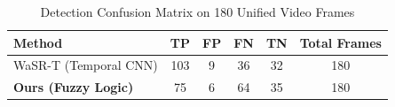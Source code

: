 \begin{table}[htbp]
\centering
\caption{Performance and Latency Benchmark on NVIDIA Jetson Orin Nano (25W Power Mode)}
\label{tab:main_benchmark_comparison}
\end{table}

\begin{table}[htbp]
\centering
\caption{Detection Confusion Matrix on 180 Unified Video Frames}
\label{tab:confusion_matrix}
\begin{tabular}{lccccc}
\toprule
Method & TP & FP & FN & TN & Total Frames \\
\midrule
WaSR-T (Temporal CNN) & 103 & 9 & 36 & 32 & 180 \\
\textbf{Ours (Fuzzy Logic)}  & 75 & 6 & 64 & 35 & 180 \\
\bottomrule
\end{tabular}
\end{table}
